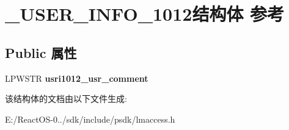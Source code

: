 \hypertarget{struct___u_s_e_r___i_n_f_o__1012}{}\section{\+\_\+\+U\+S\+E\+R\+\_\+\+I\+N\+F\+O\+\_\+1012结构体 参考}
\label{struct___u_s_e_r___i_n_f_o__1012}
\subsection*{Public 属性}
\begin{DoxyCompactItemize}
\item 
\mbox{\label{struct___u_s_e_r___i_n_f_o__1012_a33a040043ee667382403910f2a95a7cd}} 
L\+P\+W\+S\+TR {\bfseries usri1012\+\_\+usr\+\_\+comment}
\end{DoxyCompactItemize}


该结构体的文档由以下文件生成\+:\begin{DoxyCompactItemize}
\item 
E\+:/\+React\+O\+S-\/0../sdk/include/psdk/lmaccess.\+h\end{DoxyCompactItemize}
